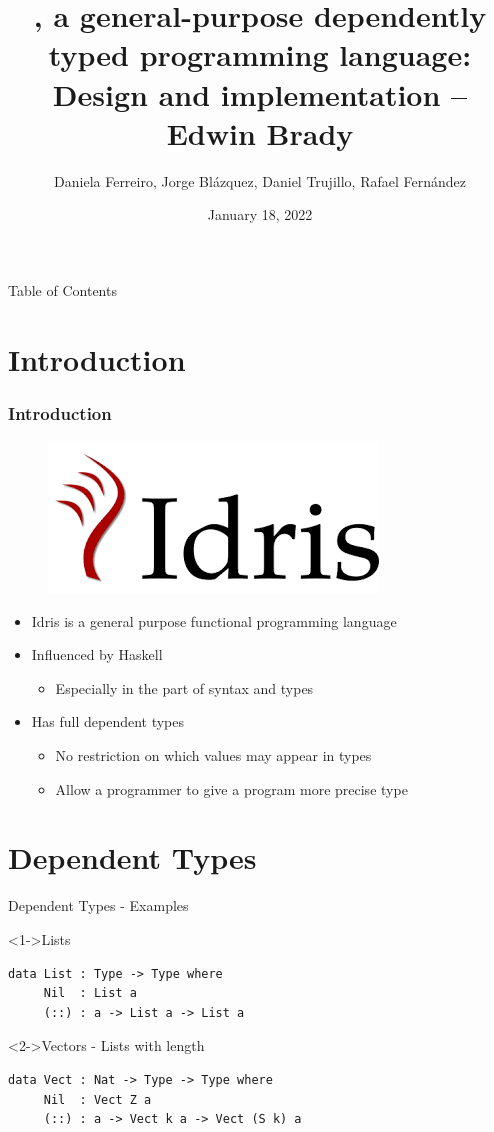 \documentclass{beamer}
\title{\Idris, a general-purpose dependently typed programming language: Design and implementation -- Edwin Brady}
\author{Daniela Ferreiro, Jorge Blázquez, Daniel Trujillo, Rafael Fernández}
\date{January 18, 2022}
\begin{document}
\frame{\titlepage}

\begin{frame}{Table of Contents}
	\tableofcontents
\end{frame}
\newcommand{\intro}{Introduction}
\section{\intro}
\label{sec:intro}

\begin{frame}
	\frametitle{\intro}
	\begin{figure}
		\includegraphics[width=0.3\linewidth]{pics/idris.png}
		\label{fig:boat1}
	\end{figure}
	\begin{itemize}
		\setlength\itemsep{1em} 
		\item Idris is a general purpose functional programming language
 
		\item Influenced by Haskell
		\begin{itemize}
			\item Especially in the part of syntax and types
		\end{itemize}   
		\item Has full dependent types
		\begin{itemize}
			\item No restriction on which values may appear in types
			\item Allow a programmer to give a program more precise type
		\end{itemize}   
	\end{itemize}
\end{frame}

\newcommand{\dependentTypes}{Dependent Types}
\section{\dependentTypes}
\label{sec:dependentTypes}
\begin{frame}[fragile]{Dependent Types - Examples}
	
	\begin{block}<1->{Lists}
		 \begin{lstlisting}[basicstyle=\ttfamily\scriptsize]
data List : Type -> Type where
     Nil  : List a
     (::) : a -> List a -> List a		
		\end{lstlisting}
	\end{block}
	
	\begin{block}<2->{Vectors - Lists with length}
		 \begin{lstlisting}[basicstyle=\ttfamily\scriptsize]
data Vect : Nat -> Type -> Type where
     Nil  : Vect Z a
     (::) : a -> Vect k a -> Vect (S k) a	
		\end{lstlisting}
	\end{block}
\end{frame}
\end{document}
